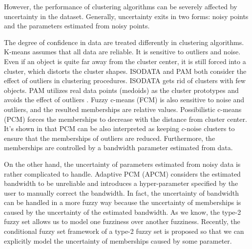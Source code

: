 \documentclass[journal,transmag]{IEEEtran}
\theoremstyle{definition}
\begin{document}
However, the performance of clustering algorithms can be severely affected by uncertainty in the dataset. Generally, uncertainty exits in two forms: noisy points and the parameters estimated from noisy points.

The degree of confidence in data are treated differently in clustering algorithms.
K-means \cite{jain_data_2010} assumes that all data are reliable. It is sensitive to outliers and noise. Even if an object is quite far away from the cluster center, it is still forced into a cluster, which distorts the cluster shapes. ISODATA \cite{ball_clustering_1967} and PAM \cite{kaufman_finding_2009} both consider the effect of outliers in clustering procedures. ISODATA gets rid of clusters with few objects. PAM utilizes real data points (medoids) as the cluster prototypes and avoids the effect of outliers \cite{xu_survey_2005}.
Fuzzy c-means (FCM) \cite{bezdek_pattern_2013} is also sensitive to noise and outliers, and the resulted memberships are relative values.  Possibilistic c-means (PCM) \cite{krishnapuram_possibilistic_1993} forces the memberships to decrease with the distance from cluster center. It's shown in \cite{dave_robust_1997} that PCM can be also interpreted as keeping $c\text{-noise}$ clusters to ensure that the memberships of outliers are reduced. Furthermore, the memberships are controlled by a bandwidth parameter estimated from data.

On the other hand, the uncertainty of parameters estimated from noisy data is rather complicated to handle.
Adaptive PCM (APCM) \cite{xenaki_novel_2016} considers the estimated bandwidth to be unreliable and introduces a hyper-parameter specified by the user to manually correct the bandwidth. In fact, the uncertainty of bandwidth can be handled in a more fuzzy way because the uncertainty of memberships is caused by the uncertainty of the estimated bandwidth.
As we know, the type-2 fuzzy set \cite{zadeh_concept_1975}\cite{mendel_type-2_2002} allows us to model one fuzziness over another fuzziness. Recently, the conditional fuzzy set framework \cite{wang_new_2016} of a type-2 fuzzy set is proposed so that we can explicitly model the uncertainty of memberships caused by some parameter.
\end{document}
